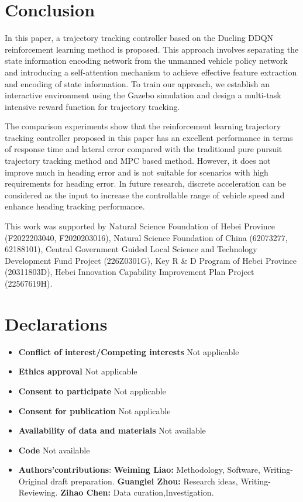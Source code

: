 \documentclass[sn-mathphys]{sn-jnl}%
\theoremstyle{thmstyleone}%
\theoremstyle{thmstyletwo}%
\theoremstyle{thmstylethree}%
\begin{document}
\section{Conclusion}\label{sec4}
In this paper, a trajectory tracking controller based on the Dueling DDQN reinforcement learning method is proposed. This approach involves separating the state information encoding network from the unmanned vehicle policy network and introducing a self-attention mechanism to achieve effective feature extraction and encoding of state information. To train our approach, we establish an interactive environment using the Gazebo simulation and design a multi-task intensive reward function for trajectory tracking.

The comparison experiments show that the reinforcement learning trajectory tracking controller proposed in this paper has an excellent performance in terms of response time and lateral error compared with the traditional pure pursuit trajectory tracking method and MPC based method. However, it does not improve much in heading error and is not suitable for scenarios with high requirements for heading error. In future research, discrete acceleration can be considered as the input to increase the controllable range of vehicle speed and enhance heading tracking performance.


This work was supported by Natural Science Foundation of Hebei Province (F2022203040, F2020203016), Natural Science Foundation of China (62073277, 62188101), Central Government Guided Local Science and Technology Development Fund Project (226Z0301G), Key R \& D Program of Hebei Province (20311803D), Hebei Innovation Capability Improvement Plan Project (22567619H).




\section*{Declarations}
\begin{itemize}
	\item \textbf{Conflict of interest/Competing interests} Not applicable
	\item \textbf{Ethics approval} Not applicable
	\item \textbf{Consent to participate} Not applicable
	\item \textbf{Consent for publication} Not applicable
	\item \textbf{Availability of data and materials} Not available
	\item \textbf{Code} Not available
	\item \textbf{Authors'contributions}:  
 	\textbf{Weiming Liao:} Methodology, Software, Writing-Original draft preparation. \textbf{Guanglei Zhou:} Research ideas, Writing-Reviewing. \textbf{Zihao Chen:} Data curation,Investigation.
\end{itemize}
\end{document}
